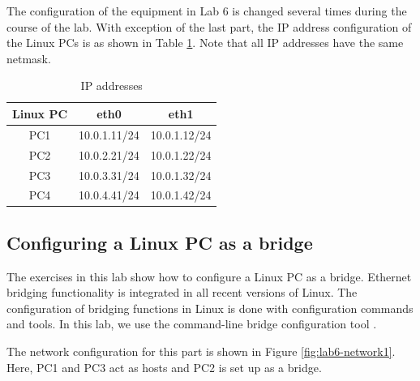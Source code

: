The configuration of the equipment in Lab 6 is changed several times during the course of the lab. With exception of the last part, the IP address configuration of the Linux PCs is as shown in Table \ref{tab:lab6-network1}. Note that all IP addresses have the same netmask.

\begin{table}[h!t]
\centering
	\begin{tabular}{| c | c | c |}	
		\hline
		\textbf{Linux PC} & \textbf{eth0} & \textbf{eth1} \\ \hline
		PC1 & 10.0.1.11/24 & 10.0.1.12/24 \\ 
		PC2 & 10.0.2.21/24 & 10.0.1.22/24 \\
		PC3 & 10.0.3.31/24 & 10.0.1.32/24 \\
		PC4 & 10.0.4.41/24 & 10.0.1.42/24 \\ \hline
	\end{tabular}
	\caption{IP addresses}
	\label{tab:lab6-network1}
\end{table}

\newpage
\subsection{Configuring a Linux PC as a bridge}

The exercises in this lab show how to configure a Linux PC as a bridge. Ethernet bridging functionality is integrated in all recent versions of Linux. The configuration of bridging functions in Linux is done with configuration commands and tools. In this lab, we use the command-line bridge configuration tool .

The network configuration for this part is shown in Figure \ref{fig:lab6-network1}. Here, PC1 and PC3 act as hosts and PC2 is set up as a bridge.

